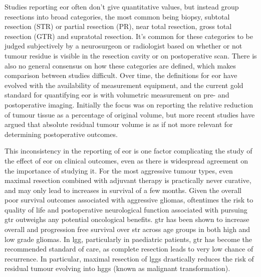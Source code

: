 Studies reporting \gls{eor} often don't give quantitative values, but instead group resections into broad categories, the most common being biopsy, subtotal resection (STR) or partial resection (PR), near total resection, gross total resection (GTR) and supratotal resection\autocite{Wykes2021,Karschnia2021}.
It's common for these categories to be judged subjectively by a neurosurgeon or radiologist based on whether or not tumour residue is visible in the resection cavity or on postoperative scan.
There is also no general consensus on how these categories are defined, which makes comparison between studies difficult\autocite{Karschnia2021}.
Over time, the definitions for \gls{eor} have evolved with the availability of measurement equipment, and the current gold standard for quantifying \gls{eor} is with volumetric measurement on pre- and postoperative imaging\autocite{Rincon-Torroella2019}.
Initially the focus was on reporting the relative reduction of tumour tissue as a percentage of original volume, but more recent studies have argued that absolute residual tumour volume is as if not more relevant for determining postoperative outcomes\autocite{Ius2012,Rincon-Torroella2019,Smith2008,Karschnia2021}.

This inconsistency in the reporting of \gls{eor} is one factor complicating the study of the effect of \gls{eor} on clinical outcomes, even as there is widespread agreement on the importance of studying it\autocite{Rincon-Torroella2019,Wykes2021,Weller2021}.
For the most aggressive tumour types, even maximal resection combined with adjuvant therapy is practically never curative, and may only lead to increases in survival of a few months\autocite{Rincon-Torroella2019,Karschnia2023}.
Given the overall poor survival outcomes associated with aggressive gliomas, oftentimes the risk to quality of life and postoperative neurological function associated with pursuing \gls{gtr} outweighs any potential oncological benefits\autocite{Rahman2016,Tabor2021}.
\Gls{gtr} has been shown to increase overall and progression free survival over \gls{str} across age groups in both high\autocite{Hatoum2022, Han2020, Adams2016, McCrea2015, Bloch2012, McGirt2009, Kramm2006} and low grade \autocite{Keles2001, Pollack1995, Sanai2008} gliomas.
In \gls{lgg}, particularly in paediatric patients, \gls{gtr} has become the recommended standard of care, as complete resection leads to very low chance of recurrence\autocite{Berger1994}.
In particular, maximal resection of \glspl{lgg} drastically reduces the risk of residual tumour evolving into \glspl{hgg} (known as malignant transformation)\autocite{Hervey-Jumper2016,Rincon-Torroella2019}.

